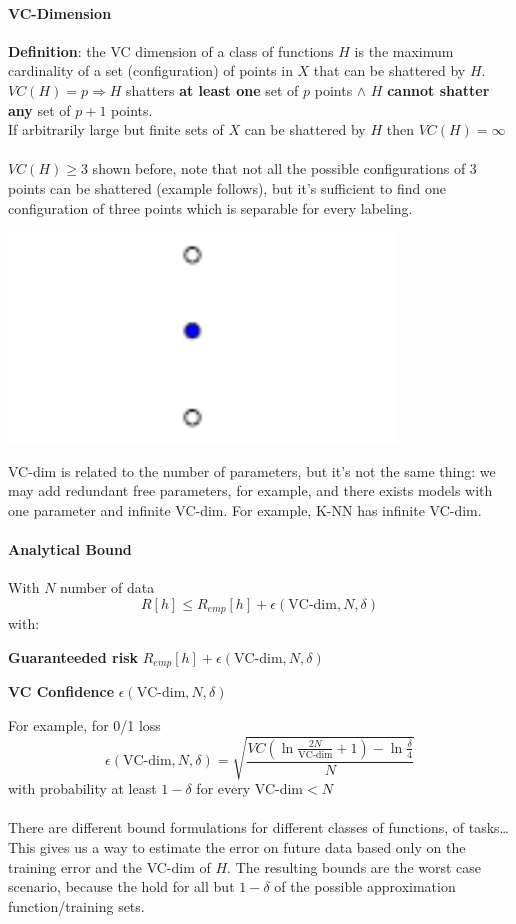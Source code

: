 \documentclass[10pt]{report}
\begin{document}
\paragraph{VC-Dimension} \textbf{Definition}: the VC dimension of a class of functions $H$ is the maximum cardinality of a set (configuration) of points in $X$ that can be shattered by $H$.\\
$VC(H) = p \Rightarrow H$ shatters \textbf{at least one} set of $p$ points $\wedge$ $H$ \textbf{cannot shatter any} set of $p+1$ points.\\
If arbitrarily large but finite sets of $X$ can be shattered by $H$ then $VC(H) = \infty$\\\\
$VC(H)\geq 3$ shown before, note that not all the possible configurations of $3$ points can be shattered (example follows), but it's sufficient to find one configuration of three points which is separable for every labeling.
\begin{center}
	\includegraphics[scale=0.5]{15.png}
\end{center}
VC-dim is related to the number of parameters, but it's not the same thing: we may add redundant free parameters, for example, and there exists models with one parameter and infinite VC-dim. For example, K-NN has infinite VC-dim.
\paragraph{Analytical Bound} With $N$ number of data $$R[h]\leq R_{emp}[h] + \epsilon\left(\text{VC-dim}, N, \delta\right)$$
with:
\begin{list}{}{}
	\item \textbf{Guaranteeded risk} $R_{emp}[h] + \epsilon\left(\text{VC-dim}, N, \delta\right)$
	\item \textbf{VC Confidence} $\epsilon\left(\text{VC-dim}, N, \delta\right)$
\end{list}
For example, for 0/1 loss $$\epsilon\left(\text{VC-dim}, N, \delta\right) = \sqrt{\frac{VC\left(\ln\frac{\displaystyle 2N}{\displaystyle \text{VC-dim}}+1\right) - \ln\frac{\displaystyle \delta}{\displaystyle 4}}{N}}$$ with probability at least $1-\delta$ for every VC-dim$< N$\\\\
There are different bound formulations for different classes of functions, of tasks\ldots\\
This gives us a way to estimate the error on future data based only on the training error and the VC-dim of $H$. The resulting bounds are the worst case scenario, because the hold for all but $1-\delta$ of the possible approximation function/training sets.
\end{document}
